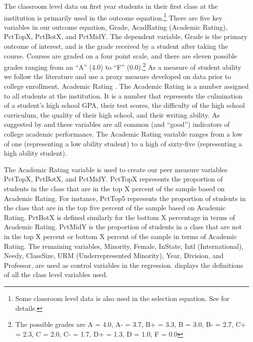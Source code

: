 The classroom level data on first year students in their first class at the institution is primarily used in the outcome equation.\footnote{Some classroom level data is also used in the selection equation. See  for details.}
There are five key variables in our outcome equation, Grade, AcadRating (Academic Rating), PctTopX, PctBotX, and PctMidY. 
The dependent variable, Grade is the primary outcome of interest, and is the grade received by a student after taking the course. 
Courses are graded on a four point scale, and there are eleven possible grades ranging from an ``A'' (4.0) to ``F'' (0.0).\footnote{The possible grades are A = 4.0, A- = 3.7, B+ = 3.3, B = 3.0, B- = 2.7, C+ = 2.3, C = 2.0, C- = 1.7, D+ = 1.3, D = 1.0, F = 0.0} 
As a measure of student ability we follow the literature and use a proxy measure developed on data prior to college enrollment, Academic Rating \citep{griffith2014peer,smith2015new}. 
The Academic Rating is a number assigned to all students at the institution. 
It is a number that represents the culmination of a student's high school GPA, their test scores, the difficulty of the high school curriculum, the quality of their high school, and their writing ability. 
As suggested by \citet{betts2003determinants} and \citet{dooley2012persistence} these variables are all common (and ``good'') indicators of college academic performance.
The Academic Rating variable ranges from a low of one (representing a low ability student) to a high of sixty-five (representing a high ability student).

The Academic Rating variable is used to create our peer measure variables PctTopX, PctBotX, and PctMidY. 
PctTopX represents the proportion of students in the class that are in the top X percent of the sample based on Academic Rating. 
For instance, PctTop5 represents the proportion of students in the class that are in the top five percent of the sample based on Academic Rating.
PctBotX is defined similarly for the bottom X percentage in terms of Academic Rating. 
PctMidY is the proportion of students in a class that are not in the top X percent or bottom X percent of the sample in terms of Academic Rating. 
The remaining variables, Minority, Female, InState, Intl (International), Needy, ClassSize, URM (Underrepresented Minority), Year, Division, and Professor, are used as control variables in the regression.
 displays the definitions of all the class level variables used. 

\bigskip

